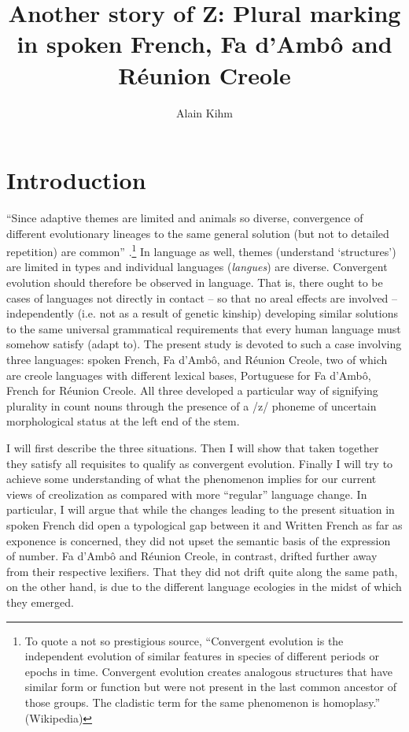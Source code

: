 \documentclass[output=paper]{langscibook}
\author{Alain Kihm\orcid{}\affiliation{Université Paris Cité}}
\title[Plural marking in spoken French, Fa d’Ambô and Réunion Creole]{Another story of Z: Plural marking in spoken French, Fa d’Ambô and Réunion Creole}
\begin{document}
\AffiliationsWithoutIndexing{}
\maketitle 



\section{Introduction}\label{sec:kihm:1}
\largerpage[-2]
“Since adaptive themes are limited and animals so diverse, convergence of different evolutionary lineages to the same general solution (but not to detailed repetition) are common” \citep[412]{Gould1985}.\footnote{To quote a not so prestigious source, “Convergent evolution is the independent evolution of similar features in species of different periods or epochs in time. Convergent evolution creates analogous structures that have similar form or function but were not present in the last common ancestor of those groups. The cladistic term for the same phenomenon is homoplasy.” (Wikipedia)} In language as well, themes (understand ‘structures’) are limited in types and individual languages (\textit{langues}) are diverse. Convergent evolution should therefore be observed in language. That is, there ought to be cases of languages not directly in contact -- so that no areal effects are involved -- independently (i.e. not as a result of genetic kinship) developing similar solutions to the same universal grammatical requirements that every human language must somehow satisfy (adapt to). The present study is devoted to such a case involving three languages: spoken French, Fa d’Ambô, and Réunion Creole, two of which are creole languages with different lexical bases, Portuguese for Fa d’Ambô, French for Réunion Creole. All three developed a particular way of signifying plurality in count nouns through the presence of a /z/ phoneme of uncertain morphological status at the left end of the stem.

I will first describe the three situations. Then I will show that taken together they satisfy all requisites to qualify as convergent evolution. Finally I will try to achieve some understanding of what the phenomenon implies for our current views of creolization as compared with more “regular” language change. In particular, I will argue that while the changes leading to the present situation in spoken French did open a typological gap between it and Written French as far as exponence is concerned, they did not upset the semantic basis of the expression of number. Fa d’Ambô and Réunion Creole, in contrast, drifted further away from their respective lexifiers. That they did not drift quite along the same path, on the other hand, is due to the different language ecologies in the midst of which they emerged.
\end{document}
